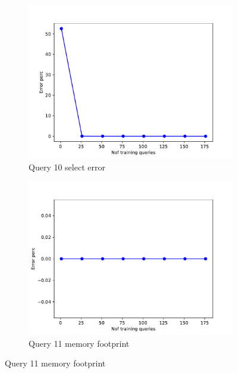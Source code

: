 \begin{figure}[!htb]
  \begin{subfigure}[t]{0.5\textwidth}
    \includegraphics[scale=0.4]{figs/tpch10/tpch10_sel10_error.pdf}
    \caption{Query 10 select error}
    \label{fig:tpch_sel10}
  \end{subfigure}
  \begin{subfigure}[t]{0.5\textwidth}
    \includegraphics[scale=0.4]{figs/tpch10/tpch10_sel11_error.pdf}
    \caption{Query 11 memory footprint}
    \label{fig:tpch_sel11}
   \end{subfigure}


\end{figure}
